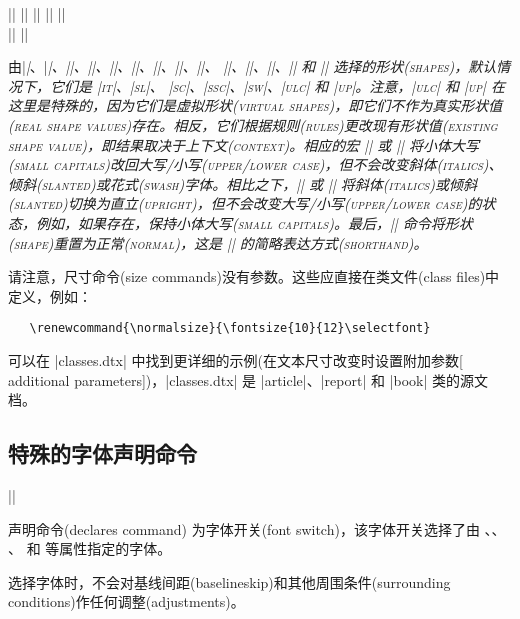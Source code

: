 \documentclass{ltxguide}[1995/11/28]
\newcommand{\heiti}{\CJKfamily{heiti}} %
\begin{document}
\begin{decl}
  |\itdefault|  \qquad
  |\sldefault|  \qquad
  |\scdefault|  \qquad
  |\sscdefault| \qquad
  |\swdefault|  \\
  |\ulcdefault| \qquad
  |\updefault|
\end{decl}
由|\textit|、|\itshape|、|\textsl|、|\slshape|、|\textsc|、|\scshape|、|\textssc|、|\sscshape|、|\textsw|、 |\swshape|、|\textulc|、|\ulcshape|、|\textup| 和 |\upshape| 选择的形状(shapes)，默认情况下，它们是 |it|、|sl|、 |sc|、|ssc|、|sw|、|ulc| 和 |up|。注意，|ulc| 和 |up| 在这里是特殊的，因为它们是虚拟形状(virtual shapes)，即它们不作为真实形状值(real shape values)存在。相反，它们根据规则(rules)更改现有形状值(existing shape value)，即结果取决于上下文(context)。相应的宏 |\textulc| 或 |\ulcshape| 将小体大写(small capitals)改回大写/小写(upper/lower case)，但不会改变斜体(italics)、倾斜(slanted)或花式(swash)字体。相比之下，|\upshape| 或 |\textup| 将斜体(italics)或倾斜(slanted)切换为直立(upright)，但不会改变大写/小写(upper/lower case)的状态，例如，如果存在，保持小体大写(small capitals)。最后，|\normalshape| 命令将形状(shape)重置为正常(normal)，这是 |\upshape\ulcshape| 的简略表达方式(shorthand)。

请注意，尺寸命令(size commands)没有参数。这些应直接在类文件(class files)中定义，例如：
\begin{verbatim}
   \renewcommand{\normalsize}{\fontsize{10}{12}\selectfont}
\end{verbatim}

可以在 |classes.dtx| 中找到更详细的示例(在文本尺寸改变时设置附加参数[ additional parameters])，|classes.dtx| 是 |article|、|report| 和 |book| 类的源文档。

\subsection[特殊的字体声明命令]{\heiti 特殊的字体声明命令}

\begin{decl}
  |\DeclareFixedFont|    
                       
\end{decl}

声明命令(declares command)  为字体开关(font switch)，该字体开关选择了由 、、 、 和  等属性指定的字体。

选择字体时，不会对基线间距(baselineskip)和其他周围条件(surrounding conditions)作任何调整(adjustments)。
\end{document}
